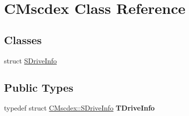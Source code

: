 \hypertarget{classCMscdex}{\section{C\-Mscdex Class Reference}
\label{classCMscdex}
}
\subsection*{Classes}
\begin{DoxyCompactItemize}
\item 
struct \hyperlink{structCMscdex_1_1SDriveInfo}{S\-Drive\-Info}
\end{DoxyCompactItemize}
\subsection*{Public Types}
\begin{DoxyCompactItemize}
\item 
\hypertarget{classCMscdex_afadd6af7423df34d6ad4db7f72b9226e}{typedef struct \hyperlink{structCMscdex_1_1SDriveInfo}{C\-Mscdex\-::\-S\-Drive\-Info} {\bfseries T\-Drive\-Info}}\label{classCMscdex_afadd6af7423df34d6ad4db7f72b9226e}

\end{DoxyCompactItemize}
